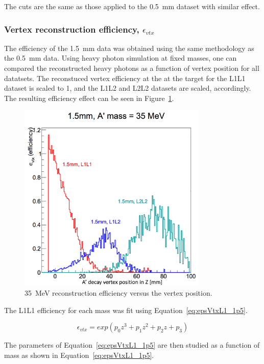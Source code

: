 The cuts are the same as those applied to the 0.5~mm dataset with similar effect.

\subsubsection{Vertex reconstruction efficiency, $\epsilon_{vtx}$}

The efficiency of the 1.5~mm data was obtained using the same methodology as the 0.5~mm data. Using heavy photon simulation at fixed masses, one can compared the reconstructed heavy photons as a function of vertex position for all datatsets. The reconstuced vertex efficiency at the at the target for the L1L1 dataset is scaled to 1, and the L1L2 and L2L2 datasets are scaled, accordingly. The resulting efficiency effect can be seen in Figure~\ref{fig:eff1p5mm}.

\begin{figure}[H]
  \centering
     \includegraphics[width=0.8\textwidth]{plots/Effplots_1p5.png}
  \caption{35~MeV reconstruction efficiency versus the vertex position. }
  \label{fig:eff1p5mm}
\end{figure} 

The L1L1 efficiency for each mass was fit using Equation~\eqref{eq:epsVtxL1_1p5}. 

\begin{equation}
\label{eq:epsVtxL1_1p5}
\epsilon_{vtx} = exp(p_0z^3+p_1z^2+p_2z+p_3) 
\end{equation}

 The parameters of Equation~\eqref{eq:epsVtxL1_1p5} are then studied as a function of mass as shown in Equation~\eqref{eq:epsVtxL1_1p5}.

